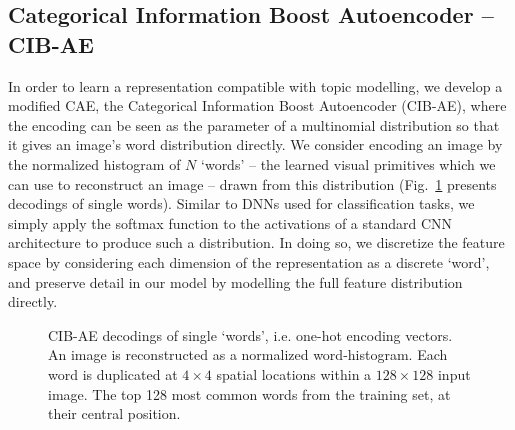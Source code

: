 \subsection{Categorical Information Boost Autoencoder -- CIB-AE}

In order to learn a representation compatible with topic modelling, we develop a modified CAE, the Categorical Information Boost Autoencoder (CIB-AE), where the encoding can be seen as the parameter of a multinomial distribution so that it gives an image's word distribution directly. We consider encoding an image by the normalized histogram of $N$ `words' -- the learned visual primitives which we can use to reconstruct an image -- drawn from this distribution (Fig.~\ref{fig:cibae-words} presents decodings of single words). Similar to DNNs used for classification tasks, we simply apply the softmax function to the activations of a standard CNN architecture to produce such a distribution. In doing so, we discretize the feature space by considering each dimension of the representation as a discrete `word', and preserve detail in our model by modelling the full feature distribution directly.

\begin{figure}
    \caption{CIB-AE decodings of single `words', i.e. one-hot encoding vectors. An image is reconstructed as a normalized word-histogram.
             \protect{} Each word is duplicated at $4 \times 4$ spatial locations within a $128 \times 128$ input image.
             \protect{} The top 128 most common words from the training set, at their central position.}
    \label{fig:cibae-words}
\end{figure}

